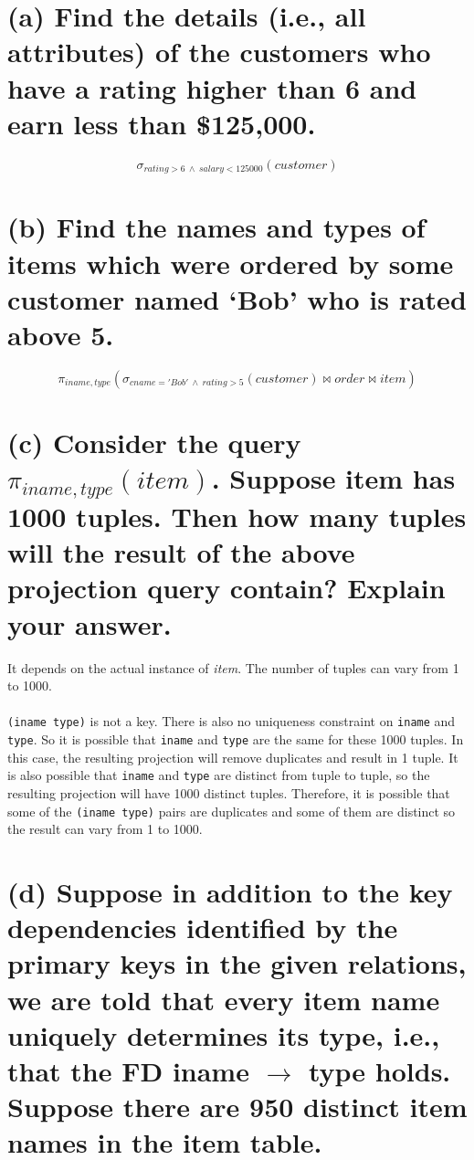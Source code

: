 \documentclass{article}
\begin{document}
\section{(a) Find the details (i.e., all attributes) of the customers who have a rating higher than 6 and earn less than \$125,000.}
\[
\sigma_{rating > 6 \  \wedge \ salary < 125000}(customer)
\]

\section{(b) Find the names and types of items which were ordered by some customer named `Bob' who is rated above 5.}
\[
\pi_{iname, type}(\sigma_{cname='Bob' \ \wedge \ rating > 5}(customer) \bowtie order \bowtie item)
\]

\section{(c) Consider the query \(\pi_{iname,type}(item)\). Suppose item has 1000 tuples. Then how many tuples
will the result of the above projection query contain? Explain your answer.}

It depends on the actual instance of \textit{item}. The number of tuples can vary from 1 to 1000.\\
\\
\texttt{(iname type)} is not a key. There is also no uniqueness constraint on \texttt{iname} and \texttt{type}. So it is possible that \texttt{iname} and \texttt{type} are the same for these 1000 tuples. In this case, the resulting projection will remove duplicates and result in 1 tuple. It is also possible that \texttt{iname} and \texttt{type} are distinct from tuple to tuple, so the resulting projection will have 1000 distinct tuples. Therefore, it is possible that some of the \texttt{(iname type)} pairs are duplicates and some of them are distinct so the result can vary from 1 to 1000.


\section{(d) Suppose in addition to the key dependencies identified by the primary keys in the given
relations, we are told that every item name uniquely determines its type, i.e., that the FD
iname \(\to\) type holds. Suppose there are 950 distinct item names in the item table.}
\end{document}
